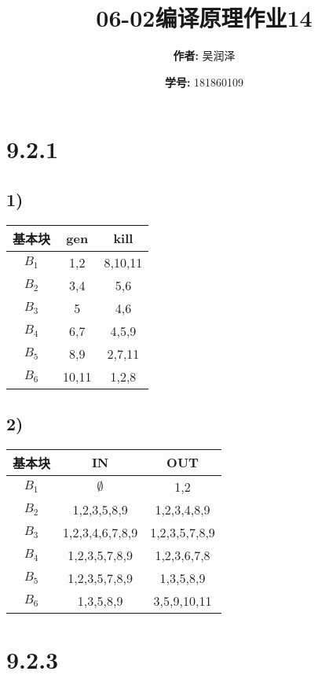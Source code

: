 \documentclass[11pt]{article}
\title{06-02编译原理作业14}
\author{
			\textbf{作者:} {吴润泽}
			\and {\textbf{学号:} 181860109}
		}
\begin{document}
\maketitle
\section*{9.2.1}
\subsection*{1)}
\begin{table}[H]
\centering
\begin{tabular}{|c|c|c|}
	\hline
	\textbf{基本块} & \textbf{gen} & \textbf{kill} \\ \hline
	$B_1$ & 1,2 & 8,10,11 \\ \hline
	$B_2$ & 3,4 & 5,6 \\ \hline
	$B_3$ & 5 & 4,6 \\ \hline
	$B_4$ & 6,7 & 4,5,9 \\ \hline
	$B_5$ & 8,9 & 2,7,11 \\ \hline
	$B_6$ & 10,11 & 1,2,8 \\ \hline
\end{tabular}
\end{table}
\subsection*{2)}
\begin{table}[H]
\centering
\begin{tabular}{|c|c|c|}
	\hline
	\textbf{基本块} & \textbf{IN} & \textbf{OUT} \\ \hline
	$B_1$ & $\emptyset$ & 1,2 \\ \hline
	$B_2$ & 1,2,3,5,8,9 & 1,2,3,4,8,9 \\ \hline
	$B_3$ & 1,2,3,4,6,7,8,9 & 1,2,3,5,7,8,9 \\ \hline
	$B_4$ & 1,2,3,5,7,8,9 & 1,2,3,6,7,8 \\ \hline
	$B_5$ & 1,2,3,5,7,8,9 & 1,3,5,8,9 \\ \hline
	$B_6$ & 1,3,5,8,9 & 3,5,9,10,11 \\ \hline
\end{tabular}
\end{table}
\section*{9.2.3}
\end{document}
